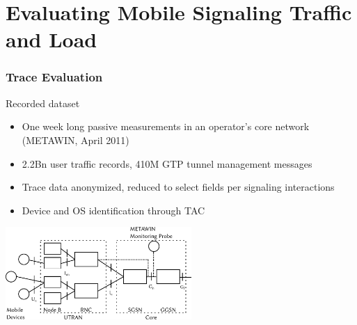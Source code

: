 \documentclass{beamer}
\def\Put(#1,#2)#3{\leavevmode\makebox(0,0){\put(#1,#2){#3}}}
\begin{document}
\section{Evaluating Mobile Signaling Traffic and Load}


\begin{frame}
	\frametitle{Trace Evaluation}
	\begin{block}{Recorded dataset}
	\begin{itemize}
		\item One week long passive measurements in an operator's core network (METAWIN, April 2011)
		\item 2.2Bn user traffic records, 410M GTP tunnel management messages
		\item Trace data anonymized, reduced to select fields per signaling interactions
		\item Device and OS identification through TAC
	\end{itemize}
	\end{block}
	\begin{center}
		\includegraphics[height=3.5cm]{../../chapters/04-mobilenets/images/umts-network.pdf}
	\end{center}
	\vspace{3em}
\end{frame}
\end{document}
